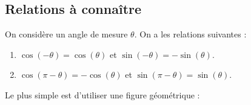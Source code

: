 \documentclass[10pt,openright,twoside,french]{book}
\begin{document}
\subsection{Relations à connaître}

\begin{Prop}
    On considère un angle de mesure $\theta$. On a les relations suivantes :
    \begin{enumerate}
        \item $\cos(-\theta) = \cos(\theta)$ et $\sin(-\theta) = -\sin(\theta)$.
        \item $\cos(\pi -\theta) = -\cos(\theta)$ et $\sin(\pi-\theta) = \sin(\theta)$.
    \end{enumerate}
\end{Prop}

\begin{Demo}
    Le plus simple est d'utiliser une figure géométrique :


\end{Demo}
\end{document}
